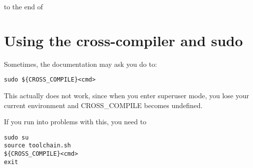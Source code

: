 to the end of 

\section{Using the cross-compiler and sudo}

Sometimes, the documentation may ask you do to:

\begin{verbatim}
sudo ${CROSS_COMPILE}<cmd>
\end{verbatim}

This actually does not work, since when you enter superuser mode, you
lose your current environment and CROSS\_COMPILE becomes undefined.

If you run into problems with this, you need to
\begin{verbatim}
sudo su
source toolchain.sh
${CROSS_COMPILE}<cmd>
exit
\end{verbatim}

